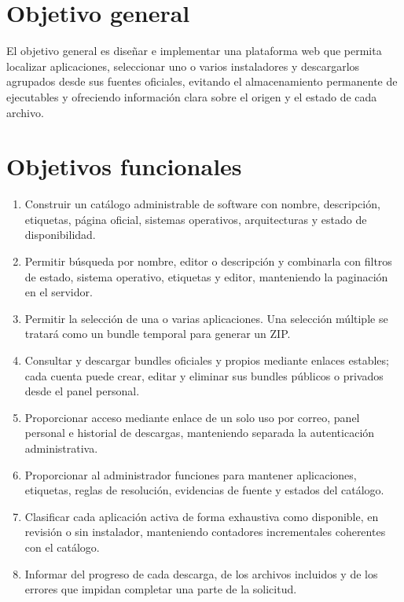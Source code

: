 
\section{Objetivo general}

El objetivo general es diseñar e implementar una plataforma web que permita localizar aplicaciones, seleccionar uno o varios instaladores y descargarlos agrupados desde sus fuentes oficiales, evitando el almacenamiento permanente de ejecutables y ofreciendo información clara sobre el origen y el estado de cada archivo.

\section{Objetivos funcionales}

\begin{enumerate}
	\item Construir un catálogo administrable de software con nombre, descripción, etiquetas, página oficial, sistemas operativos, arquitecturas y estado de disponibilidad.
	\item Permitir búsqueda por nombre, editor o descripción y combinarla con filtros de estado, sistema operativo, etiquetas y editor, manteniendo la paginación en el servidor.
	\item Permitir la selección de una o varias aplicaciones. Una selección múltiple se tratará como un bundle temporal para generar un ZIP.
	\item Consultar y descargar bundles oficiales y propios mediante enlaces estables; cada cuenta puede crear, editar y eliminar sus bundles públicos o privados desde el panel personal.
	\item Proporcionar acceso mediante enlace de un solo uso por correo, panel personal e historial de descargas, manteniendo separada la autenticación administrativa.
	\item Proporcionar al administrador funciones para mantener aplicaciones, etiquetas, reglas de resolución, evidencias de fuente y estados del catálogo.
	\item Clasificar cada aplicación activa de forma exhaustiva como disponible, en revisión o sin instalador, manteniendo contadores incrementales coherentes con el catálogo.
	\item Informar del progreso de cada descarga, de los archivos incluidos y de los errores que impidan completar una parte de la solicitud.
\end{enumerate}

